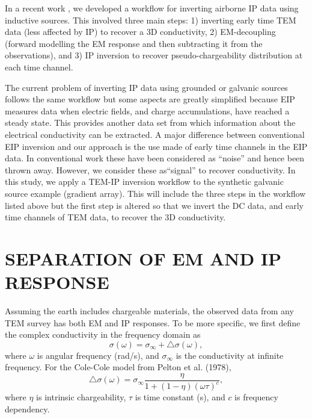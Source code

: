 \documentclass[paper]{geophysics}
\newcommand{\siginf}{\sigma_\infty}
\begin{document}
In a recent work \cite[]{Kang2016}, we developed a workflow for inverting airborne IP data using inductive sources. This involved three main steps: 1) inverting early time TEM data (less affected by IP) to recover a 3D conductivity, 2) EM-decoupling (forward modelling the EM response and then subtracting it from the observations), and 3) IP inversion to recover pseudo-chargeability distribution at each time channel.

The current problem of inverting IP data using grounded or galvanic sources follows the same workflow but some aspects are greatly simplified because EIP measures data when electric fields, and charge accumulations, have reached a steady state. This provides another data set from which information about the electrical conductivity can be extracted.  A major difference between conventional EIP inversion and our approach is the use made of early time channels in the EIP data. In conventional work these have been considered as ``noise'' and hence been thrown away. However, we consider these as``signal'' to recover conductivity. In this study, we apply a TEM-IP inversion workflow to the synthetic galvanic source example (gradient array). This will include the three steps in the workflow listed above but the first step is altered so that we invert the DC data, and early time channels of TEM data, to recover the 3D conductivity.





\section{SEPARATION OF EM AND IP RESPONSE}
Assuming the earth includes chargeable materials, the observed data from any TEM survey has both EM and IP responses. To be more specific, we first define the complex conductivity in the frequency domain as
\begin{equation}
  \sigma(\omega)= \sigma_{\infty} + \triangle\sigma(\omega),
  \label{eq:sigmafreq}
\end{equation}
where $\omega$ is angular frequency (rad/s), and $\siginf$ is the conductivity at infinite frequency. For the Cole-Cole model from Pelton et al. (1978),
\begin{equation}
  \triangle\sigma(\omega) = \sigma_{\infty}\frac{\eta}{1+(1-\eta)(\omega\tau)^c},
  \label{eq:sigmaColeCole}
\end{equation}
where $\eta$ is intrinsic chargeability, $\tau$ is time constant (s), and $c$ is frequency dependency.
\end{document}
